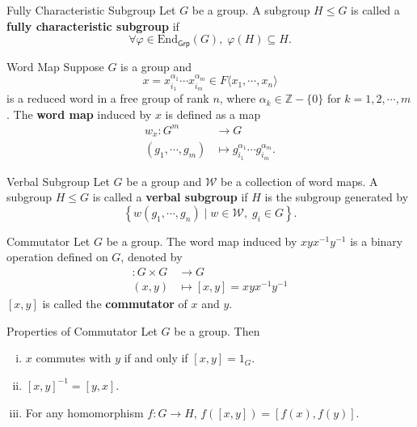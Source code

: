 \begin{definition}{Fully Characteristic Subgroup}{}
    Let $G$ be a group. A subgroup $H\le G$ is called a \textbf{fully characteristic subgroup} if
    \[
        \forall \varphi \in\mathrm{End}_{\mathsf{Grp}}(G),\; \varphi(H)\subseteq H.
    \]
\end{definition}

\begin{definition}{Word Map}{}
    Suppose $G$ is a group and
    $$
        x=x_{i_1}^{\alpha_{1}}\cdots x_{i_m}^{\alpha_{m}}\in F\langle x_1,\cdots,x_n\rangle
    $$
    is a reduced word in a free group of rank $n$, where $\alpha_k\in\mathbb{Z}-\{0\}$ for $k=1,2,\cdots,m$. The \textbf{word map} induced by $x$ is defined as a map
    \begin{align*}
        w_x:G^m          & \longrightarrow G                                        \\
        (g_1,\cdots,g_m) & \longmapsto g_{i_1}^{\alpha_1}\cdots g_{i_m}^{\alpha_m}.
    \end{align*}
\end{definition}

\begin{definition}{Verbal Subgroup}{}
    Let $G$ be a group and $\mathcal{W}$ be a collection of word maps. A subgroup $H\le G$ is called a \textbf{verbal subgroup} if $H$ is the subgroup generated by
    $$
        \left\{ w(g_1,\cdots,g_n)\mid w\in\mathcal{W},\; g_i\in G \right\}.
    $$
\end{definition}

\begin{definition}{Commutator}{}
    Let $G$ be a group. The word map induced by $xyx^{-1}y^{-1}$ is a binary operation defined on $G$, denoted by
    \begin{align*}
        [\cdot,\cdot]:G\times G & \longrightarrow G                \\
        (x,y)                   & \longmapsto [x,y]=xyx^{-1}y^{-1}
    \end{align*}
    $[x,y]$ is called the \textbf{commutator} of $x$ and $y$.
\end{definition}

\begin{proposition}{Properties of Commutator}{}
    Let $G$ be a group. Then
    \begin{enumerate}[(i)]
        \item $x$ commutes with $y$ if and only if $[x,y]=1_G$.
        \item $[x,y]^{-1}=[y,x]$.
        \item For any homomorphism $f:G\to H$, $f([x,y])=[f(x),f(y)]$.
    \end{enumerate}
\end{proposition}

